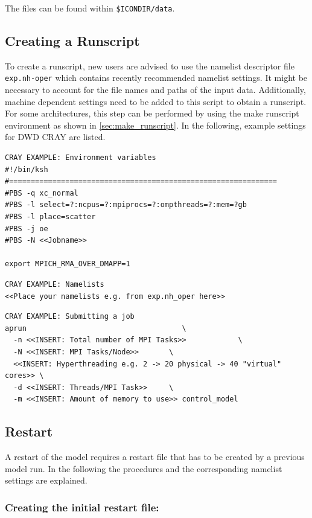 The files can be found within \verb+$ICONDIR/data+.

\subsection{Creating a Runscript}

To create a runscript, new users are advised to use the namelist descriptor file \verb+exp.nh-oper+ which contains recently recommended namelist settings. It might be necessary to account for the file names and paths of the input data. Additionally, machine dependent settings need to be added to this script to obtain a runscript. For some architectures, this step can be performed by using the make runscript environment as shown in \ref{sec:make_runscript}. In the following, example settings for DWD CRAY are listed.

\begin{Verbatim}[frame=single]
CRAY EXAMPLE: Environment variables
#!/bin/ksh
#==============================================================
#PBS -q xc_normal
#PBS -l select=?:ncpus=?:mpiprocs=?:ompthreads=?:mem=?gb
#PBS -l place=scatter
#PBS -j oe
#PBS -N <<Jobname>>

export MPICH_RMA_OVER_DMAPP=1
\end{Verbatim}

\begin{Verbatim}[frame=single]
CRAY EXAMPLE: Namelists
<<Place your namelists e.g. from exp.nh_oper here>>
\end{Verbatim}

\begin{Verbatim}[frame=single]
CRAY EXAMPLE: Submitting a job
aprun                                    \
  -n <<INSERT: Total number of MPI Tasks>>            \
  -N <<INSERT: MPI Tasks/Node>>       \
  <<INSERT: Hyperthreading e.g. 2 -> 20 physical -> 40 "virtual" cores>> \
  -d <<INSERT: Threads/MPI Task>>     \
  -m <<INSERT: Amount of memory to use>> control_model
\end{Verbatim}


\subsection{Restart}

A restart of the model requires a restart file that has to be created by a 
previous model run. In the following the procedures and the corresponding namelist settings are explained.

\subsubsection{Creating the initial restart file:}

